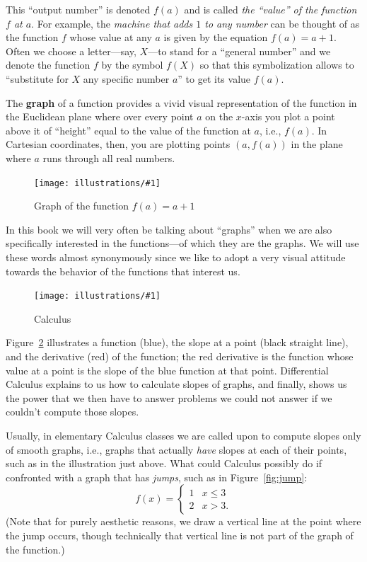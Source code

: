 \documentclass[openany]{book}
\newcommand{\ill}[3]{%
   \begin{figure}[H]%
   \vspace{-2ex}
   \centering%
   \texttt{[image: illustrations/\#1]}%
   \caption{#3}%
   \vspace{-2ex}
    \end{figure}}
\theoremstyle{plain}
\theoremstyle{definition}
\begin{document}
{{ This ``output number'' is denoted $f(a)$ and is called {\it the
   ``value'' of the function $f$ at $a$}.  For example, the {\it
   machine that adds $1$ to any number} can be thought of as the
 function $f$ whose value at any $a$ is given by the equation $f(a) =
 a+1$.  Often we choose a letter---say, $X$---to stand for a ``general
 number'' and we denote the function $f$ by the symbol $f(X)$ so that
 this symbolization allows to ``substitute for $X$ any specific number
 $a$'' to get its value $f(a)$.

 The {\bf graph} of a function provides a vivid visual representation of the
 function in the Euclidean plane where over every point $a$ on the
 $x$-axis you plot a point above it of ``height'' equal to the value of
 the function at $a$, i.e., $f(a)$. In Cartesian coordinates, then,
 you are plotting points $(a, f(a))$ in the plane where $a$ runs
 through all real numbers.

 \ill{graph_aplusone}{0.6}{Graph of the function $f(a)=a+1$\label{fig:graph_aplusone}}

 In this book we will very often be talking about ``graphs'' when we
 are also specifically interested in the functions---of which they are
 the graphs. We will use these words almost synonymously since we like
 to adopt a very visual attitude towards the behavior of the functions
 that interest us.


 \ill{graph_slope_deriv}{0.7}{\label{fig:graph_slope_deriv}Calculus}



 Figure~\ref{fig:graph_slope_deriv} illustrates a function (blue), the
 slope at a point (black straight line), and the derivative (red) of
 the function; the red derivative is the function whose value at a point
 is the slope of the blue function at that point.  Differential
 Calculus explains to us how to calculate slopes of graphs, and
 finally, shows us the power that we then have to answer problems we
 could not answer if we couldn't compute those slopes.

Usually, in elementary Calculus classes we are called upon to compute
slopes only of smooth graphs, i.e., graphs that actually {\em have}
slopes at each of their points, such as in the illustration just
above.  What could Calculus possibly do if confronted with a graph
that has {\em jumps}, such as in Figure~\ref{fig:jump}:
$$f(x) = \begin{cases}1 & x \leq 3\\ 2 & x > 3.\end{cases}$$
(Note that for purely aesthetic reasons, we draw a vertical line at the point where the jump occurs, though technically that vertical line is not part of the graph of the function.)

}}
\end{document}
